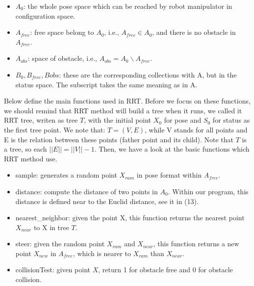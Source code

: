 \documentclass[letterpaper, 10 pt, conference]{ieeeconf}  %
\begin{document}
\begin{itemize}

\item $A_{0}$: the whole pose space which can be reached by robot manipulator in configuration space.

\item $A_{free}$: free space belong to $A_{0}$, i.e., $A_{free} \in A_{0}$, and there is no obstacle in $A_{free}$. 

\item $A_{obs}$: space of obstacle, i.e., $A_{obs} = A_{0}  \backslash A_{free}$.

\item $B_{0}, B_{free}, B{obs}$: these are the corresponding collections with A, but in the status space. The subscript takes the same meaning as in A.

\end{itemize}

Below define the main functions used in RRT. Before we focus on these functions, we should remind that RRT method will build a tree when it runs, we called it RRT tree, writen as tree $T$, with the initial point $X_{0}$ for pose and  $S_{0}$ for status as the first tree point. We note that: $T = (V, E)$, while V stands for all points and E is the relation between these points (father point and its child). Note that $T$ is a tree, so each $||E||=||V||-1$. Then, we have a look at the basic functions which RRT method use.

\begin{itemize}

\item sample:  generates a random point $X_{ram}$ in pose format within $A_{free}$.

\item distance:  compute the distance of two points in $A_{0}$. Within our program, this distance is defined near to the Euclid distance, see it in (13).

\item nearest\_neighbor: given the point X, this function returns the nearest point $X_{near}$ to X in tree $T$.

\item steer: given the random point $X_{ram}$ and $X_{near}$, this function returns a new point $X_{new}$ in $A_{free}$, which is nearer to $X_{ram}$ than $X_{near}$.

\item collisionTest: given point $X$, return 1 for obstacle free and 0 for obstacle collision. 

\end{itemize}
\end{document}
